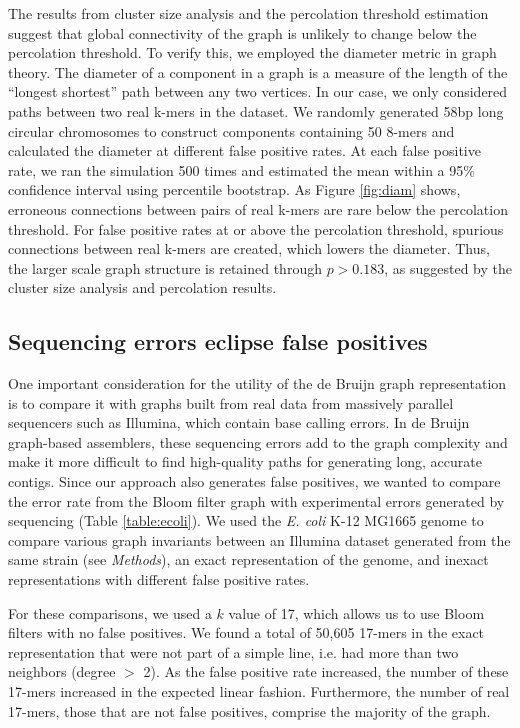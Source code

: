 \documentclass{pnastwo}
\begin{document}
\begin{article}
The results from cluster size analysis and the percolation threshold
estimation suggest that global connectivity of the graph is unlikely
to change below the percolation threshold. To verify this, we employed
the diameter metric in graph theory.  The diameter of a component in a
graph is a measure of the length of the ``longest shortest'' path
between any two vertices\cite{bondy2008graph}.  In our case, we only
considered paths between two real k-mers in the dataset.  We randomly generated 58bp long
circular chromosomes to construct components containing 50 8-mers and
calculated the diameter at different false positive rates. At each
false positive rate, we ran the simulation 500 times and estimated the
mean within a 95\% confidence interval using percentile bootstrap. As Figure \ref{fig:diam} shows, erroneous
connections between pairs of real k-mers are rare below the
percolation threshold. For false positive rates at or above the
percolation threshold, spurious connections between real k-mers are
created, which lowers the diameter.  Thus, the larger scale graph
structure is retained through $p > 0.183$, as suggested by the cluster
size analysis and percolation results.

\subsection{Sequencing errors eclipse false positives}

One important consideration for the utility of the de Bruijn graph
representation is to compare it with graphs built from real data from
massively parallel sequencers such as Illumina, which contain base
calling errors.  In de Bruijn graph-based assemblers, these sequencing
errors add to the graph complexity and make it more difficult to find
high-quality paths for generating long, accurate contigs. Since our
approach also generates false positives, we wanted to compare the
error rate from the Bloom filter graph with experimental errors
generated by sequencing (Table \ref{table:ecoli}). We used the \emph{E. coli} K-12
MG1665 genome to compare various graph invariants between an Illumina
dataset generated from the same strain (see \emph{Methods}), an exact
representation of the genome, and inexact representations with
different false positive rates.

For these comparisons, we used a $k$ value of 17, which allows us to
use Bloom filters with no false positives.
We found a
total of 50,605 17-mers in the exact representation that were not part
of a simple line, i.e. had more than two neighbors (degree $>$ 2). As
the false positive rate increased, the number of these 17-mers
increased in the expected linear fashion.
Furthermore, the
number of real 17-mers, those that are not false positives,
comprise the majority of the graph.


\end{article}
\end{document}
